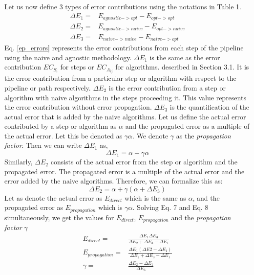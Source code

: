Let us now define 3 types of error contributions using the notations in Table 1.
\begin{equation}
\label{ep_errors}
\begin{aligned}
\Delta E_1 =& E_{agnostic->opt} - E_{opt->opt} \\
\Delta E_2 =& E_{agnostic->naive} - E_{opt->naive} \\ 
\Delta E_3 =& E_{naive->naive} - E_{naive->opt}
\end{aligned}
\end{equation}
Eq. \ref{ep_errors} represents the error contributions from each step of the pipeline using the naive and agnostic methodology. $\Delta E_1$ is the same as the error contribution $EC_{S_i}$ for steps or $EC_{A_{ij}}$ for algorithms. described in Section 3.1. It is the error contribution from a particular step or algorithm with respect to the pipeline or path respectively. $\Delta E_2$ is the error contribution from a step or algorithm with naive algorithms in the steps proceeding it. This value represents the error contribution without error propagation. $\Delta E_3$ is the quantification of the actual error that is added by the naive algorithms.  Let us define the actual error contributed by a step or algorithm as $\alpha$ and the propagated error as a multiple of the actual error. Let this be denoted as $\gamma\alpha$. We denote $\gamma$ as the \textit{propagation factor}.  Then we can write $\Delta E_1$ as,
\begin{equation}
\Delta E_1 = \alpha + \gamma\alpha
\end{equation}
Similarly, $\Delta E_2$ consists of the actual error from the step or algorithm and the propagated error. The propagated error is a multiple of the actual error and the error added by the naive algorithms. Therefore, we can formalize this as:
\begin{equation}
\Delta E_2 = \alpha + \gamma(\alpha + \Delta E_3)
\end{equation}
Let as denote the actual error as $E_{direct}$ which is the same as $\alpha$, and the propagated error as $E_{propagation}$ which is $\gamma\alpha$. Solving Eq. 7 and Eq. 8 simultaneously, we get the values for $E_{direct}$, $E_{propagation}$ and the \textit{propagation factor} $\gamma$
\begin{equation}
\begin{aligned}
E_{direct} =& \frac{\Delta E_1 \Delta E_3}{\Delta E_2 + \Delta E_3 - \Delta E_1} \\
E_{propagation} =& \frac{\Delta E_1 (\Delta E2 - \Delta E_1)}{\Delta E_2 + \Delta E_3 - \Delta E_1}\\
\gamma =& \frac{\Delta E_2 - \Delta E_1}{\Delta E_3}
\end{aligned}
\end{equation}

